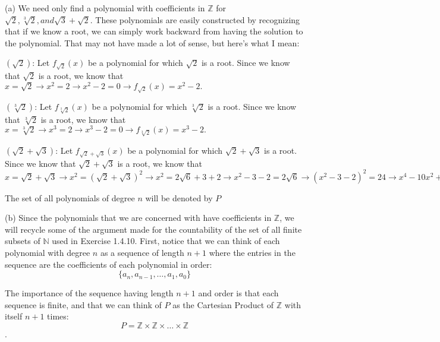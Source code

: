 \documentclass[12pt]{article}
\newcommand{\N}{\mathbb{N}}
\newcommand{\Z}{\mathbb{Z}}
\begin{document}
\noindent (a) We need only find a polynomial with coefficients in $\Z$ for $\sqrt{2}, \sqrt[3]{2}, and \sqrt{3} + \sqrt{2}.$ These polynomials are easily constructed by recognizing that if we know a root, we can simply work backward from having the solution to the polynomial. That may not have made a lot of sense, but here's what I mean: \newline

\noindent $(\sqrt{2})$: Let $f_{\sqrt{2}}(x)$ be a polynomial for which $\sqrt{2}$ is a root. Since we know that $\sqrt{2}$ is a root, we know that $x = \sqrt{2} \rightarrow x^2 = 2 \rightarrow x^2 - 2 = 0 \rightarrow f_{\sqrt{2}}(x) = x^2 - 2.$ \newline

\noindent $(\sqrt[3]{2})$: Let $f_{\sqrt[3]{2}}(x)$ be a polynomial for which $\sqrt[3]{2}$ is a root. Since we know that $\sqrt[3]{2}$ is a root, we know that $x = \sqrt[3]{2} \rightarrow x^3 = 2 \rightarrow x^3 - 2 = 0 \rightarrow f_{\sqrt[3]{2}}(x) = x^3 - 2.$ \newline

\noindent $(\sqrt{2} + \sqrt{3})$: Let $f_{\sqrt{2} + \sqrt{3}}(x)$ be a polynomial for which $\sqrt{2} + \sqrt{3}$ is a root. Since we know that $\sqrt{2} + \sqrt{3}$ is a root, we know that $x = \sqrt{2} + \sqrt{3} \rightarrow x^2 = (\sqrt{2} + \sqrt{3})^2 \rightarrow x^2 = 2\sqrt{6} + 3 + 2 \rightarrow x^2 - 3 - 2 = 2\sqrt{6} \rightarrow (x^2 - 3 - 2)^2 = 24 \rightarrow x^4 - 10x^2 + 25 = 24 \rightarrow x^4 - 10x^2 + 1 = 0 \rightarrow f_{\sqrt{2} + \sqrt{3}}(x) = x^4 - 10x^2 + 1$\newline

\noindent The set of all polynomials of degree $n$ will be denoted by $P$ \newline

\noindent (b) Since the polynomials that we are concerned with have coefficients in $\Z$, we will recycle some of the argument made for the countability of the set of all finite subsets of $\N$ used in Exercise 1.4.10. First, notice that we can think of each polynomial with degree $n$ as a sequence of length $n+1$ where the entries in the sequence are the coefficients of each polynomial in order: 
$$\{a_n,a_{n-1},\ldots,a_1,a_0\}$$

The importance of the sequence having length $n+1$ and order is that each sequence is finite, and that we can think of $P$ as the Cartesian Product of $\Z$ with itself $n+1$ times: $$P = \Z \times \Z \times \ldots \times \Z$$. 
\end{document}
